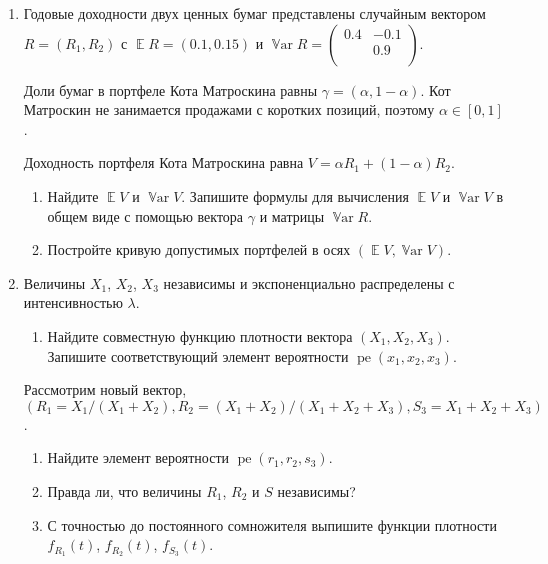 \documentclass[12pt]{article}
\DeclareMathOperator{\Var}{\mathbb{V}ar}
\DeclareMathOperator{\pe}{pe}
\DeclareMathOperator{\E}{\mathbb{E}}
\begin{document}
\begin{enumerate}
\item Годовые доходности двух ценных бумаг представлены случайным вектором $R = (R_1, R_2)$
с $\E R = (0.1, 0.15)$ и $\Var R = \begin{pmatrix}
    0.4 & -0.1 \\
     & 0.9 \\
\end{pmatrix}$.

Доли бумаг в портфеле Кота Матроскина равны $\gamma = (\alpha, 1- \alpha)$.
Кот Матроскин не занимается продажами с коротких позиций, поэтому $\alpha \in [0, 1]$.

Доходность портфеля Кота Матроскина равна $V = \alpha R_1 + (1 - \alpha) R_2$.

\begin{enumerate}
    \item Найдите $\E V$ и $\Var V$. Запишите формулы для вычисления $\E V$ и $\Var V$ в общем виде с помощью вектора $\gamma$ и матрицы $\Var R$.
    \item Постройте кривую допустимых портфелей в осях $(\E V, \Var V)$.
\end{enumerate}

\item Величины $X_1$, $X_2$, $X_3$ независимы и экспоненциально распределены с интенсивностью $\lambda$. 
\begin{enumerate}
        \item Найдите совместную функцию плотности вектора $(X_1, X_2, X_3)$.
    Запишите соответствующий элемент вероятности $\pe(x_1, x_2, x_3)$. 
\end{enumerate}
Рассмотрим новый вектор, $(R_1 = X_1 / (X_1 + X_2), R_2 = (X_1 + X_2) / (X_1 + X_2 + X_3), S_3 = X_1 + X_2 + X_3)$.
\begin{enumerate}[resume]
\item Найдите элемент вероятности $\pe(r_1, r_2, s_3)$.
\item Правда ли, что величины $R_1$, $R_2$ и $S$ независимы?
\item С точностью до постоянного сомножителя выпишите функции плотности $f_{R_1}(t)$, $f_{R_2}(t)$, $f_{S_3}(t)$.
\end{enumerate}


\end{enumerate}
\end{document}
